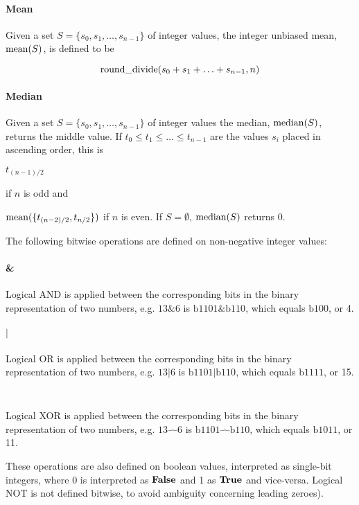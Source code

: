 \paragraph*{Mean} Given a set  $S=\{s_0, s_1, \hdots, s_{n-1}\}$ of integer values, the integer unbiased mean, $\operatorname{mean}(S)$, is defined
to be

\[\operatorname{round\_divide}(s_0+s_1+\hdots +s_{n-1},n)\]

\paragraph*{Median} Given a set $S=\{s_0, s_1, \hdots, s_{n-1} \}$ of integer values the median, $\operatorname{median}(S)$, 
returns the middle value. If $t_0\leq t_1\leq \hdots \leq t_{n-1}$ are the values $s_i$ placed in ascending order, this
is 

$t_{(n-1)/2}$ 

if $n$ is odd and

$\operatorname{mean}(\{ t_{(n-2)/2},t_{n/2}\})$ if $n$ is even. If $S=\emptyset$, $\operatorname{median}(S)$ returns 0.

The following bitwise operations are defined on non-negative integer values:
\paragraph*{\&} Logical AND is applied between the corresponding bits in the binary representation of two numbers, e.g.
$13\&6$ is $\text{b1101}\&\text{b110}$, which equals $\text{b100}$, or 4.

\paragraph*{$\mathbf{|}$} Logical OR is applied between the corresponding bits in the binary representation of two numbers, e.g.
$13|6$ is $\text{b1101}\text{|}\text{b110}$, which equals $\text{b1111}$, or 15.

\paragraph*{\Large$\hat\quad$} Logical XOR is applied between the corresponding bits in the binary representation of two numbers, e.g.
$13\hat\quad 6$ is $\text{b1101}\hat\quad\text{b110}$, which equals $\text{b1011}$, or 11.

These operations are also defined on boolean values, interpreted as single-bit integers, 
where 0 is interpreted as $\text{\bf{False}}$ and 1 as $\text{\bf{True}}$ and vice-versa. Logical NOT is 
not defined bitwise, to avoid ambiguity concerning leading zeroes).


